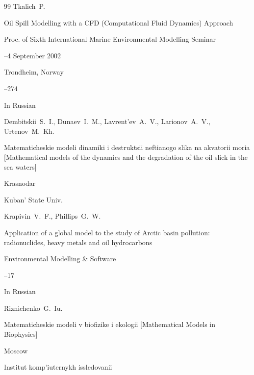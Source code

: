 \begin{thebibliography}{99}
\by Tkalich~P.

\paper Oil Spill Modelling with a CFD (Computational Fluid Dynamics) Approach

\inbook Proc. of Sixth International Marine Environmental Modelling Seminar

--4 September 2002


\publaddr Trondheim, Norway

--274




\lang In Russian

\by Dembitskii~S.~I., Dunaev~I.~M., Lavrent'ev~A.~V., Larionov~A.~V., Urtenov~M.~Kh.

\book  Matematicheskie modeli dinamiki i destruktsii neftianogo slika na akvatorii moria \rm [Mathematical models of the dynamics and the degradation of the oil slick in the sea waters]

\publaddr Krasnodar

\publ Kuban' State Univ.






\by Krapivin~V.~F., Phillips~G.~W.

\paper Application of a global model to the study of Arctic basin pollution: radionuclides, heavy metals and oil hydrocarbons

\jour Environmental Modelling \& Software



--17





\lang In Russian 

\by Riznichenko~G.~Iu.

\book  Matematicheskie modeli v biofizike i ekologii \rm [Mathematical Models in Biophysics]

\publaddr Moscow

\publ Institut komp'iuternykh issledovanii








\end{thebibliography}
